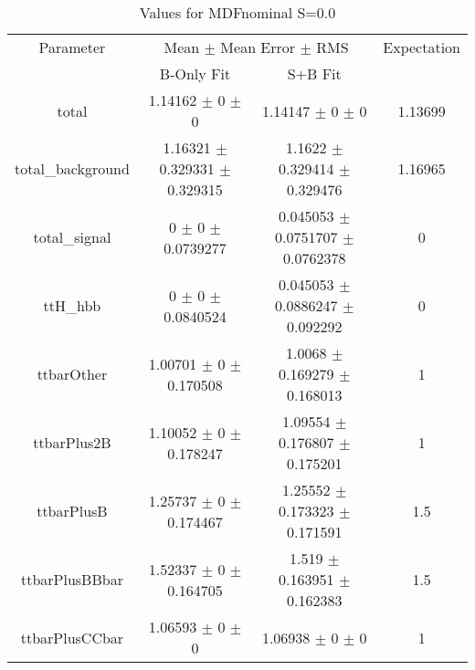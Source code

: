 \begin{table}
\centering
\caption{Values for MDFnominal S=0.0}
\begin{tabular}{cccc}
\toprule
Parameter & \multicolumn{2}{c}{Mean $\pm$ Mean Error $\pm$ RMS} & Expectation\\
 & B-Only Fit & S+B Fit & \\
\midrule
total & \num{1.14162} $\pm$ \num{0} $\pm$ \num{0} & \num{1.14147} $\pm$ \num{0} $\pm$ \num{0} & \num{1.13699}\\
total\_background & \num{1.16321} $\pm$ \num{0.329331} $\pm$ \num{0.329315} & \num{1.1622} $\pm$ \num{0.329414} $\pm$ \num{0.329476} & \num{1.16965}\\
total\_signal & \num{0} $\pm$ \num{0} $\pm$ \num{0.0739277} & \num{0.045053} $\pm$ \num{0.0751707} $\pm$ \num{0.0762378} & \num{0}\\
ttH\_hbb & \num{0} $\pm$ \num{0} $\pm$ \num{0.0840524} & \num{0.045053} $\pm$ \num{0.0886247} $\pm$ \num{0.092292} & \num{0}\\
ttbarOther & \num{1.00701} $\pm$ \num{0} $\pm$ \num{0.170508} & \num{1.0068} $\pm$ \num{0.169279} $\pm$ \num{0.168013} & \num{1}\\
ttbarPlus2B & \num{1.10052} $\pm$ \num{0} $\pm$ \num{0.178247} & \num{1.09554} $\pm$ \num{0.176807} $\pm$ \num{0.175201} & \num{1}\\
ttbarPlusB & \num{1.25737} $\pm$ \num{0} $\pm$ \num{0.174467} & \num{1.25552} $\pm$ \num{0.173323} $\pm$ \num{0.171591} & \num{1.5}\\
ttbarPlusBBbar & \num{1.52337} $\pm$ \num{0} $\pm$ \num{0.164705} & \num{1.519} $\pm$ \num{0.163951} $\pm$ \num{0.162383} & \num{1.5}\\
ttbarPlusCCbar & \num{1.06593} $\pm$ \num{0} $\pm$ \num{0} & \num{1.06938} $\pm$ \num{0} $\pm$ \num{0} & \num{1}\\
\bottomrule
\end{tabular}
\end{table}